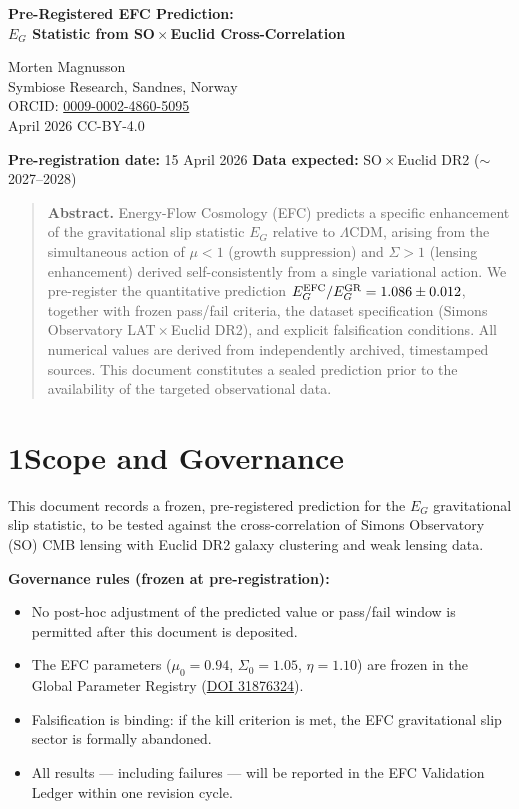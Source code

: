 \documentclass[11pt]{article}
\begin{document}
\begin{center}
{\LARGE\bfseries\color{eblue}
Pre-Registered EFC Prediction:\\[4pt]
$E_G$ Statistic from SO\,$\times$\,Euclid Cross-Correlation}

\vspace{8pt}
{\large Morten Magnusson}\\[2pt]
{\small Symbiose Research, Sandnes, Norway\\
ORCID: \href{https://orcid.org/0009-0002-4860-5095}{0009-0002-4860-5095}\\
April 2026 \quad CC-BY-4.0}

\vspace{6pt}
\textbf{Pre-registration date:} 15 April 2026\quad
\textbf{Data expected:} SO\,$\times$\,Euclid DR2 ($\sim$2027--2028)
\end{center}

\vspace{6pt}
\begin{quote}
\textbf{Abstract.}
Energy-Flow Cosmology (EFC) predicts a specific enhancement of the
gravitational slip statistic $E_G$ relative to $\Lambda$CDM, arising
from the simultaneous action of $\mu < 1$ (growth suppression) and
$\Sigma > 1$ (lensing enhancement) derived self-consistently from a single variational
action. We pre-register the quantitative prediction
$E_G^{\rm EFC}/E_G^{\rm GR} = 1.086 \pm 0.012$, together with frozen
pass/fail criteria, the dataset specification (Simons Observatory
LAT\,$\times$\,Euclid DR2), and explicit falsification conditions.
All numerical values are derived from independently archived,
timestamped sources. This document constitutes a sealed prediction
prior to the availability of the targeted observational data.
\end{quote}

\newpage
\section{1\quad Scope and Governance}

This document records a frozen, pre-registered prediction for the
$E_G$ gravitational slip statistic, to be tested against the
cross-correlation of Simons Observatory (SO) CMB lensing with
Euclid DR2 galaxy clustering and weak lensing data.

\textbf{Governance rules (frozen at pre-registration):}
\begin{itemize}[itemsep=2pt]
\item No post-hoc adjustment of the predicted value or pass/fail
  window is permitted after this document is deposited.
\item The EFC parameters ($\mu_0 = 0.94$, $\Sigma_0 = 1.05$,
  $\eta = 1.10$) are frozen in the Global Parameter Registry
  (\href{https://doi.org/10.6084/m9.figshare.31876324}{DOI 31876324}).
\item Falsification is binding: if the kill criterion is met, the
  EFC gravitational slip sector is formally abandoned.
\item All results --- including failures --- will be reported in the
  EFC Validation Ledger within one revision cycle.
\end{itemize}
\end{document}
